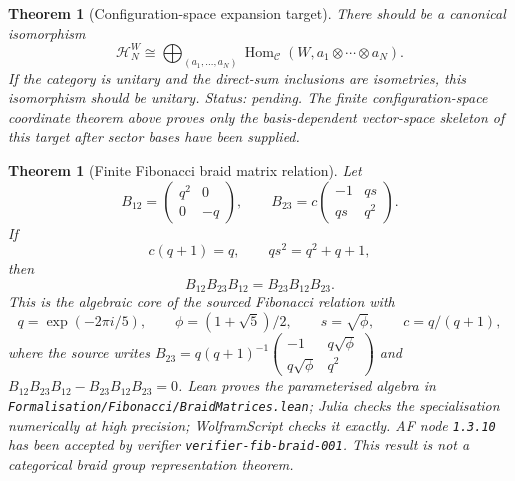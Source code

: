 \documentclass[11pt]{article}
\newtheorem{theorem}[definition]{Theorem}
\DeclareMathOperator{\Hom}{Hom}
\begin{document}
\begin{theorem}[Configuration-space expansion target]
There should be a canonical isomorphism
\[
\mathcal H_N^W\cong
\bigoplus_{(a_1,\ldots,a_N)}
\Hom_{\mathcal C}(W,a_1\otimes\cdots\otimes a_N).
\]
If the category is unitary and the direct-sum inclusions are isometries, this
isomorphism should be unitary. Status: pending. The finite configuration-space
coordinate theorem above proves only the basis-dependent vector-space
skeleton of this target after sector bases have been supplied.
\end{theorem}

\begin{theorem}[Finite Fibonacci braid matrix relation]
Let
\[
B_{12}=\begin{pmatrix}q^2&0\\0&-q\end{pmatrix},
\qquad
B_{23}=c\begin{pmatrix}-1&q s\\q s&q^2\end{pmatrix}.
\]
If
\[
c(q+1)=q,\qquad qs^2=q^2+q+1,
\]
then
\[
B_{12}B_{23}B_{12}=B_{23}B_{12}B_{23}.
\]
This is the algebraic core of the sourced Fibonacci relation with
\[
q=\exp(-2\pi i/5),\qquad
\phi=(1+\sqrt5)/2,\qquad
s=\sqrt{\phi},\qquad
c=q/(q+1),
\]
where the source writes \(B_{23}=q(q+1)^{-1}
\begin{pmatrix}-1&q\sqrt\phi\\q\sqrt\phi&q^2\end{pmatrix}\) and
\(B_{12}B_{23}B_{12}-B_{23}B_{12}B_{23}=0\).
Lean proves the parameterised algebra in
\texttt{Formalisation/Fibonacci/BraidMatrices.lean}; Julia checks the
specialisation numerically at high precision; WolframScript checks it exactly.
AF node \texttt{1.3.10} has been accepted by verifier
\texttt{verifier-fib-braid-001}. This result is not a categorical braid group
representation theorem.
\end{theorem}
\end{document}
